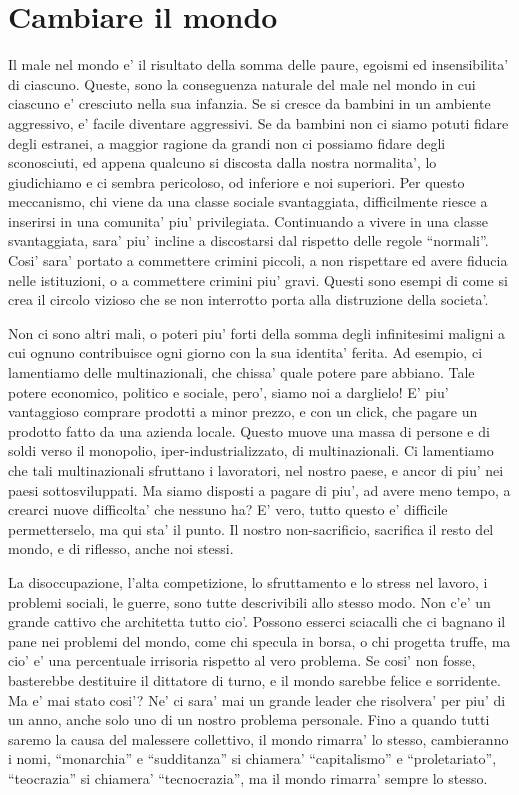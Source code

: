 \chapter{Cambiare il mondo}

Il male nel mondo e' il risultato della somma delle paure, egoismi ed insensibilita' di ciascuno. Queste, sono la conseguenza naturale del male nel mondo in cui ciascuno e' cresciuto nella sua infanzia. Se si cresce da bambini in un ambiente aggressivo, e' facile diventare aggressivi. Se da bambini non ci siamo potuti fidare degli estranei, a maggior ragione da grandi non ci possiamo fidare degli sconosciuti, ed appena qualcuno si discosta dalla nostra normalita', lo giudichiamo e ci sembra pericoloso, od inferiore e noi superiori. Per questo meccanismo, chi viene da una classe sociale svantaggiata, difficilmente riesce a inserirsi in una comunita' piu' privilegiata. Continuando a vivere in una classe svantaggiata, sara' piu' incline a discostarsi dal rispetto delle regole ``normali''. Cosi' sara' portato a commettere crimini piccoli, a non rispettare ed avere fiducia nelle istituzioni, o a commettere crimini piu' gravi. Questi sono esempi di come si crea il circolo vizioso che se non interrotto porta alla distruzione della societa'.

Non ci sono altri mali, o poteri piu' forti della somma degli infinitesimi maligni a cui ognuno contribuisce ogni giorno con la sua identita' ferita. Ad esempio, ci lamentiamo delle multinazionali, che chissa' quale potere pare abbiano. Tale potere economico, politico e sociale, pero', siamo noi a darglielo! E' piu' vantaggioso comprare prodotti a minor prezzo, e con un click, che pagare un prodotto fatto da una azienda locale. Questo muove una massa di persone e di soldi verso il monopolio, iper-industrializzato, di multinazionali. Ci lamentiamo che tali multinazionali sfruttano i lavoratori, nel nostro paese, e ancor di piu' nei paesi sottosviluppati. Ma siamo disposti a pagare di piu', ad avere meno tempo, a crearci nuove difficolta' che nessuno ha?  E' vero, tutto questo e' difficile permetterselo, ma qui sta' il punto. Il nostro non-sacrificio, sacrifica il resto del mondo, e di riflesso, anche noi stessi.

La disoccupazione, l'alta competizione, lo sfruttamento e lo stress nel lavoro, i problemi sociali, le guerre, sono tutte descrivibili allo stesso modo. Non c'e' un grande cattivo che architetta tutto cio'. Possono esserci sciacalli che ci bagnano il pane nei problemi del mondo, come chi specula in borsa, o chi progetta truffe, ma cio' e' una percentuale irrisoria rispetto al vero problema. Se cosi' non fosse, basterebbe destituire il dittatore di turno, e il mondo sarebbe felice e sorridente. Ma e' mai stato cosi'? Ne' ci sara' mai un grande leader che risolvera' per piu' di un anno, anche solo uno di un nostro problema personale. Fino a quando tutti saremo la causa del malessere collettivo, il mondo rimarra' lo stesso, cambieranno i nomi, ``monarchia'' e ``sudditanza'' si chiamera' ``capitalismo'' e ``proletariato'', ``teocrazia'' si chiamera' ``tecnocrazia'', ma il mondo rimarra' sempre lo stesso.

